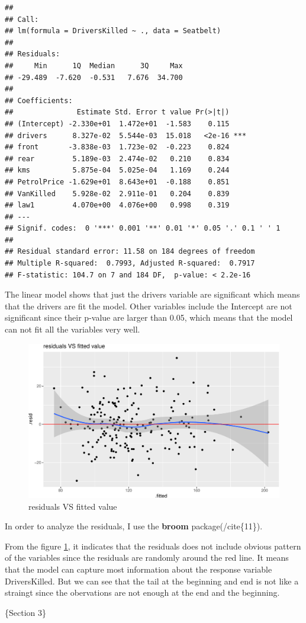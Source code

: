 \documentclass[11pt,a4paper,]{article}
\begin{document}
\begin{verbatim}
## 
## Call:
## lm(formula = DriversKilled ~ ., data = Seatbelt)
## 
## Residuals:
##     Min      1Q  Median      3Q     Max 
## -29.489  -7.620  -0.531   7.676  34.700 
## 
## Coefficients:
##               Estimate Std. Error t value Pr(>|t|)    
## (Intercept) -2.330e+01  1.472e+01  -1.583    0.115    
## drivers      8.327e-02  5.544e-03  15.018   <2e-16 ***
## front       -3.838e-03  1.723e-02  -0.223    0.824    
## rear         5.189e-03  2.474e-02   0.210    0.834    
## kms          5.875e-04  5.025e-04   1.169    0.244    
## PetrolPrice -1.629e+01  8.643e+01  -0.188    0.851    
## VanKilled    5.928e-02  2.911e-01   0.204    0.839    
## law1         4.070e+00  4.076e+00   0.998    0.319    
## ---
## Signif. codes:  0 '***' 0.001 '**' 0.01 '*' 0.05 '.' 0.1 ' ' 1
## 
## Residual standard error: 11.58 on 184 degrees of freedom
## Multiple R-squared:  0.7993, Adjusted R-squared:  0.7917 
## F-statistic: 104.7 on 7 and 184 DF,  p-value: < 2.2e-16
\end{verbatim}

The linear model shows that just the drivers variable are significant which means that the drivers are fit the model. Other variables include the Intercept are not significant since their p-value are larger than 0.05, which means that the model can not fit all the variables very well.

\begin{figure}
\centering
\includegraphics{report_files/figure-latex/residuals-1.pdf}
\caption{\label{fig:residuals}residuals VS fitted value}
\end{figure}

In order to analyze the residuals, I use the \textbf{broom} package(/cite\{11\}).

From the figure \ref{fig:residuals}, it indicates that the residuals does not include obvious pattern of the variables since the residuals are randomly around the red line. It means that the model can capture most information about the response variable DriversKilled. But we can see that the tail at the beginning and end is not like a straingt since the obervations are not enough at the end and the beginning.

\{Section 3\}

\printbibliography
\end{document}
